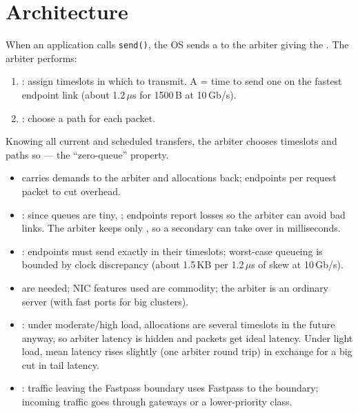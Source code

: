 \section{Architecture}
When an application calls \texttt{send()}, the OS sends a  to the arbiter giving the . The arbiter performs:
\begin{enumerate}
\item {}: assign timeslots in which to transmit. A  = time to send one  on the fastest endpoint link (about 1.2\,$\mu$s for 1500\,B at 10\,Gb/s).
\item {}: choose a path for each packet.
\end{enumerate}
Knowing all current and scheduled transfers, the arbiter chooses timeslots and paths so  --- the ``zero-queue'' property.
\begin{itemize}
\item {} carries demands to the arbiter and allocations back; endpoints  per request packet to cut overhead.
\item {}: since queues are tiny, ; endpoints report losses so the arbiter can avoid bad links. The arbiter keeps only , so a secondary can take over in milliseconds.
\item {}: endpoints must send exactly in their timeslots; worst-case queueing is bounded by clock discrepancy (about 1.5\,KB per 1.2\,$\mu$s of skew at 10\,Gb/s).
\item {} are needed; NIC features used are commodity; the arbiter is an ordinary server (with fast ports for big clusters).
\item {}: under moderate/high load, allocations are several timeslots in the future anyway, so arbiter latency is hidden and packets get ideal latency. Under light load, mean latency rises slightly (one arbiter round trip) in exchange for a big cut in tail latency.
\item {}: traffic leaving the Fastpass boundary uses Fastpass to the boundary; incoming traffic goes through gateways or a lower-priority class.
\end{itemize}

